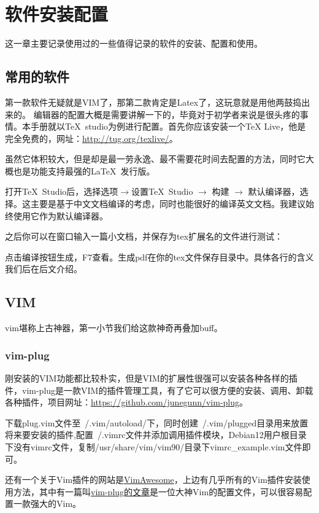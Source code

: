 \chapter{软件安装配置}
这一章主要记录使用过的一些值得记录的软件的安装、配置和使用。
\section{常用的软件}
	第一款软件无疑就是VIM了，那第二款肯定是Latex了，这玩意就是用他两鼓捣出来的。	编辑器的配置大概是需要讲解一下的，毕竟对于初学者来说是很头疼的事情。本手册就以\TeX\ studio为例进行配置。首先你应该安装一个\TeX{} Live，他是完全免费的，网址：\url{http://tug.org/texlive/}。

虽然它体积较大，但是却是最一劳永逸、最不需要花时间去配置的方法，同时它大概也是功能支持最强的\LaTeX\ 发行版。

打开\TeX\ Studio后，选择选项$\rightarrow$设置\TeX\ Studio $\rightarrow$ 构建 $\rightarrow$ 默认编译器，选择\xelatex{}。这主要是基于中文文档编译的考虑，同时\xelatex 也能很好的编译英文文档。我建议始终使用它作为默认编译器。


之后你可以在窗口输入一篇小文档，并保存为tex扩展名的文件进行测试：
点击编译按钮生成，F7查看。生成pdf在你的tex文件保存目录中。具体各行的含义我们后在后文介绍。

\section{VIM}
vim堪称上古神器，第一小节我们给这款神奇再叠加buff。
\subsection{vim-plug}
刚安装的VIM功能都比较朴实，但是VIM的扩展性很强可以安装各种各样的插件，vim-plug是一款VIM的插件管理工具，有了它可以很方便的安装、调用、卸载各种插件，项目网址：\url{https://github.com/junegunn/vim-plug}。

下载plug.vim文件至~/.vim/autoload/下，同时创建~/.vim/plugged目录用来放置将来要安装的插件,配置~/.vimrc文件并添加调用插件模块，Debian12用户根目录下没有vimrc文件，复制/usr/share/vim/vim90/目录下vimrc\_example.vim文件即可。

还有一个关于Vim插件的网站是\href{https://vimawesome.com}{VimAwesome}，上边有几乎所有的Vim插件安装使用方法，其中有一篇叫\href{https://vimawesome.com/plugin/vim-plug-own-character}{vim-plug的文章}是一位大神Vim的配置文件，可以很容易配置一款强大的Vim。

